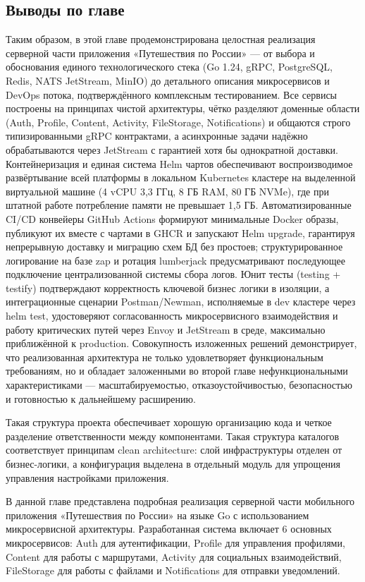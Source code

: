 \subsection*{Выводы по главе}
Таким образом, в этой главе продемонстрирована целостная реализация серверной части приложения «Путешествия по России» — от выбора и обоснования единого технологического стека (Go 1.24, gRPC, PostgreSQL, Redis, NATS JetStream, MinIO) до детального описания микросервисов и DevOps потока, подтверждённого комплексным тестированием. Все сервисы построены на принципах чистой архитектуры, чётко разделяют доменные области (Auth, Profile, Content, Activity, FileStorage, Notifications) и общаются строго типизированными gRPC контрактами, а асинхронные задачи надёжно обрабатываются через JetStream с гарантией хотя бы однократной доставки. Контейнеризация и единая система Helm чартов обеспечивают воспроизводимое развёртывание всей платформы в локальном Kubernetes кластере на выделенной виртуальной машине (4 vCPU 3,3 ГГц, 8 ГБ RAM, 80 ГБ NVMe), где при штатной работе потребление памяти не превышает 1,5 ГБ. Автоматизированные CI/CD конвейеры GitHub Actions формируют минимальные Docker образы, публикуют их вместе с чартами в GHCR и запускают Helm upgrade, гарантируя непрерывную доставку и миграцию схем БД без простоев; структурированное логирование на базе zap и ротация lumberjack предусматривают последующее подключение централизованной системы сбора логов. Юнит тесты (testing + testify) подтверждают корректность ключевой бизнес логики в изоляции, а интеграционные сценарии Postman/Newman, исполняемые в dev кластере через helm test, удостоверяют согласованность микросервисного взаимодействия и работу критических путей через Envoy и JetStream в среде, максимально приближённой к production. Совокупность изложенных решений демонстрирует, что реализованная архитектура не только удовлетворяет функциональным требованиям, но и обладает заложенными во второй главе нефункциональными характеристиками — масштабируемостью, отказоустойчивостью, безопасностью и готовностью к дальнейшему расширению.

\noindent Такая структура проекта обеспечивает хорошую организацию кода и четкое разделение ответственности между компонентами. Такая структура каталогов соответствует принципам clean architecture: слой инфраструктуры отделен от бизнес-логики, а конфигурация выделена в отдельный модуль для упрощения управления настройками приложения.

\noindent В данной главе представлена подробная реализация серверной части мобильного приложения «Путешествия по России» на языке Go с использованием микросервисной архитектуры. Разработанная система включает 6 основных микросервисов: Auth для аутентификации, Profile для управления профилями, Content для работы с маршрутами, Activity для социальных взаимодействий, FileStorage для работы с файлами и Notifications для отправки уведомлений.
